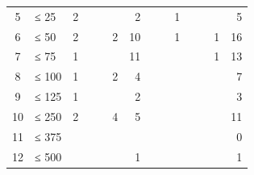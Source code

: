 {\begin{table}
\begin{tabular}{
	c
	l
	r r c
	r r c
	r r c
	r r
	r
}
5
	& ≤ 25
	& 2 %
	& %
	& %
	& %
	& 2 %
	& %
	& %
	& 1 %
	& %
	& %
	& %
	& 5
	\\

6
	& ≤ 50
	& 2 %
	& %
	& %
	& 2 %
	& 10 %
	& %
	& %
	& 1 %
	& %
	& %
	& 1 %
	& 16
	\\

7
	& ≤ 75
	& 1 %
	& %
	& %
	& %
	& 11 %
	& %
	& %
	& %
	& %
	& %
	& 1 %
	& 13
	\\

8
	& ≤ 100
	& 1 %
	& %
	& %
	& 2 %
	& 4 %
	& %
	& %
	& %
	& %
	& %
	& %
	& 7
	\\

9
	& ≤ 125
	& 1 %
	& %
	& %
	& %
	& 2 %
	& %
	& %
	& %
	& %
	& %
	& %
	& 3
	\\

10
	& ≤ 250
	& 2 %
	& %
	& %
	& 4 %
	& 5 %
	& %
	& %
	& %
	& %
	& %
	& %
	& 11
	\\

11
	& ≤ 375
	& %
	& %
	& %
	& %
	& %
	& %
	& %
	& %
	& %
	& %
	& %
	& 0
	\\

12
	& ≤ 500
	& %
	& %
	& %
	& %
	& 1 %
	& %
	& %
	& %
	& %
	& %
	& %
	& 1
	\\


\end{tabular}
\end{table}}
